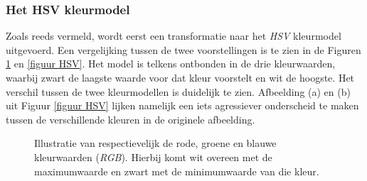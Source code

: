 \documentclass[a4paper,kulak]{kulakarticle}
\begin{document}
\subsubsection{Het HSV kleurmodel}
Zoals reeds vermeld, wordt eerst een transformatie naar het \textit{HSV} kleurmodel uitgevoerd. Een vergelijking tussen de twee voorstellingen is te zien in de Figuren \ref{figuur RGB} en \ref{figuur HSV}. Het model is telkens ontbonden in de drie kleurwaarden, waarbij zwart de laagste waarde voor dat kleur voorstelt en wit de hoogste. Het verschil tussen de twee kleurmodellen is duidelijk te zien. Afbeelding (a) en (b) uit Figuur \ref{figuur HSV} lijken namelijk een iets agressiever onderscheid te maken tussen de verschillende kleuren in de originele afbeelding.

\begin{figure}[H]
	\centering
	\qquad
	\qquad
	\caption{Illustratie van respectievelijk de rode, groene en blauwe kleurwaarden (\textit{RGB}). Hierbij komt wit overeen met de maximumwaarde en zwart met de minimumwaarde van die kleur.}
	\label{figuur RGB}
\end{figure}
\end{document}
